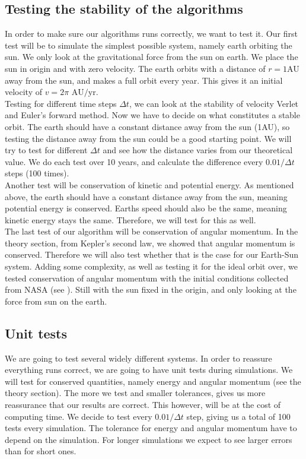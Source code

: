 \documentclass[reprint, english,notitlepage,nofootinbib]{revtex4-1}  %
\begin{document}
\subsection{Testing the stability of the algorithms}
In order to make sure our algorithms runs correctly, we want to test it. Our first test will be to simulate the simplest possible system, namely earth orbiting the sun. We only look at the gravitational force from the sun on earth. We place the sun in origin and with zero velocity. The earth orbits with a distance of $r=1$AU away from the sun, and makes a full orbit every year. This gives it an initial velocity of $v = 2\pi \text{ AU}/\text{yr}.$ 
\\
Testing for different time steps $\Delta t$, we can look at the stability of velocity Verlet and Euler's forward method. Now we have to decide on what constitutes a stable orbit. The earth should have a constant distance away from the sun (1AU), so testing the distance away from the sun could be a good starting point. We will try to test for different $\Delta t$ and see how the distance varies from our theoretical value. We do each test over 10 years, and calculate the difference every $0.01/\Delta t$ steps (100 times).
\\
Another test will be conservation of kinetic and potential energy. As mentioned above, the earth should have a constant distance away from the sun, meaning potential energy is conserved. Earths speed should also be the same, meaning kinetic energy stays the same. Therefore, we will test for this as well. 
\\
The last test of our algorithm will be conservation of angular momentum. In the theory section, from Kepler's second law, we showed that angular momentum is conserved. Therefore we will also test whether that is the case for our Earth-Sun system. Adding some complexity, as well as testing it for the ideal orbit over, we tested conservation of angular momentum with the initial conditions collected from NASA (see \citep{NASA}). Still with the sun fixed in the origin, and only looking at the force from sun on the earth.

\subsection{Unit tests}
We are going to test several widely different systems. In order to reassure everything runs correct, we are going to have unit tests during simulations. We will test for conserved quantities, namely energy and angular momentum (see the theory section). The more we test and smaller tolerances, gives us more reassurance that our results are correct. This however, will be at the cost of computing time. We decide to test every $0.01/\Delta t$ step, giving us a total of 100 tests every simulation. The tolerance for energy and angular momentum have to depend on the simulation. For longer simulations we expect to see larger errors than for short ones.
\end{document}
